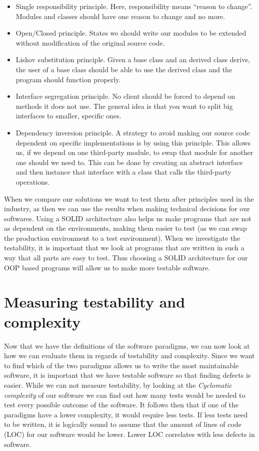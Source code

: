 \documentclass[12pt]{report}
\theoremstyle{definition}
\theoremstyle{theorem}
\begin{document}
\begin{itemize}
    \item Single responsibility principle. Here, responsibility means ``reason
        to change''. Modules and classes should have one reason to change and no
        more.
    \item Open/Closed principle. States we should write our modules to be
        extended without modification of the original source code.
    \item Liskov substitution principle. Given a base class and an derived
        class derive, the user of a base class should be able to use the derived
        class and the program should function properly.
    \item Interface segregation principle. No client should be forced to depend
        on methods it does not use. The general idea is that you want to split
        big interfaces to smaller, specific ones.
    \item Dependency inversion principle. A strategy to avoid making our source
        code dependent on specific implementations is by using this principle.
        This allows us, if we depend on one third-party module, to swap that
        module for another one should we need to. This can be done by creating
        an abstract interface and then instance that interface with a class that
        calls the third-party operations.~\cite{martinrobert}
\end{itemize}

When we compare our solutions we want to test them after principles used in the
industry, as then we can use the results when making technical decisions for our
softwares. Using a SOLID architecture also helps us make programs that are not
as dependent on the environments, making them easier to test (as we can swap the
production environment to a test environment). When we investigate the
testability, it is important that we look at programs that are written in such a
way that all parts are easy to test. Thus choosing a SOLID architecture for our
OOP based programs will allow us to make more testable software.

\chapter{Measuring testability and complexity}\label{methods}

Now that we have the definitions of the software paradigms, we can now look at
how we can evaluate them in regards of testability and complexity. Since we want
to find which of the two paradigms allows us to write the most maintainable
software, it is important that we have testable software so that finding defects
is easier. While we can not measure testability, by looking at the
\textit{Cyclomatic complexity} of our software we can find out how many tests
would be needed to test every possible outcome of the software. It follows then
that if one of the paradigms have a lower complexity, it would require less
tests. If less tests need to be written, it is logically sound to assume that
the amount of lines of code (LOC) for our software would be lower. Lower LOC
correlates with less defects in software.~\cite{defectloc} 
\end{document}
